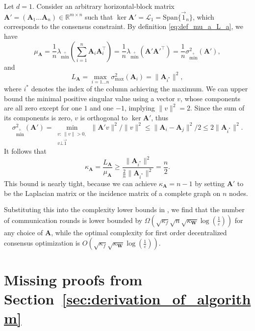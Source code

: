 \documentclass{article}
\newcommand{\Span}{\mathrm{Span}}
\newcommand{\R}{\mathbb{R}}
\newcommand{\cL}{\mathcal{L}}
\newcommand{\mA}{\mathbf{A}}
\newcommand{\mW}{\mathbf{W}}
\newcommand{\cbraces}[1]{\left( #1 \right)}
\newcommand{\cbr}[1]{\left( #1 \right)}
\newcommand{\eps}{\varepsilon}
\begin{document}
Let $d=1$.
Consider an arbitrary horizontal-block matrix $\mA' = (\mA_1 \ldots \mA_n) \in \R^{m \times n}$ such that $\ker \mA' = \cL_1 = \Span \{\vec 1_n\}$, which corresponds to the consensus constraint.
By definition \eqref{eq:def_mu_a_L_a}, we have
\begin{equation*}
\mu_\mA = \frac1n\lambda_{\min^+}\cbr{\sum_{i=1}^n \mA_i \mA_i^\top} = \frac1n\lambda_{\min^+}\cbr{\mA' \mA'^\top} = \frac1n\sigma_{\min^+}^2(\mA'),
\end{equation*}
and
\begin{equation*}
L_\mA = \max_{i=1\ldots n}\sigma^2_{\max}(\mA_i) = \|\mA_{i^*}\|^2,
\end{equation*}
where $i^*$ denotes the index of the column achieving the maximum.
We can upper bound the minimal positive singular value using a vector $v$, whose components are all zero except for one $1$ and one $-1$, implying $\|v\|^ 2= 2$. Since the sum of its components is zero, $v$ is orthogonal to $\ker \mA'$, thus
\begin{equation*}
\sigma_{\min^+}^2(\mA') =\min_{\substack{v:~ \|v\|> 0,\\ v \bot \vec 1}} \|\mA'v\|^2 / \|v\|^2 \leq \|\mA_i -\mA_j\|^2 / 2 \leq 2 \|\mA_{i^*}\|^2.
\end{equation*}
It follows that
\begin{equation*}
\kappa_\mA = \frac{L_\mA}{\mu_\mA} \geq \frac{\|\mA_{i^*}\|^2}{\frac2n\|\mA_{i^*}\|^2} = \frac n2.
\end{equation*}
This bound is nearly tight, because we can achieve $\kappa_\mA = n-1$ by setting $\mA'$ to be the Laplacian matrix or the incidence matrix of a complete graph on $n$ nodes.

Substituting this  into the complexity lower bounds in , we find that the number of communication rounds is lower bounded by 
$\Omega\cbr{\sqrt{\kappa_f}\sqrt{n}\sqrt{\kappa_\mW}\log\cbraces{\frac{1}{\eps}}}$
for any choice of $\mA$, while the optimal complexity for first order decentralized consensus optimization is  
$O\cbr{\sqrt{\kappa_f}\sqrt{\kappa_\mW}\log\cbraces{\frac{1}{\eps}}}$.

\section{Missing proofs from Section~\ref{sec:derivation_of_algorithm}}\label{app:derivation_of_algorithm}
\end{document}
